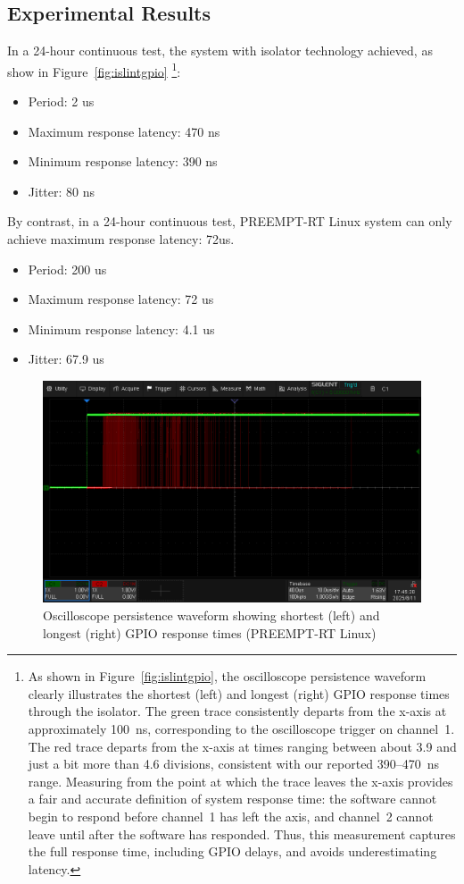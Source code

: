 \documentclass[letterpaper]{article}
\begin{document}
\subsection{Experimental Results}
In a 24-hour continuous test, the system with isolator technology achieved, as show in Figure~\ref{fig:islintgpio} \footnote {
As shown in Figure~\ref{fig:islintgpio}, the oscilloscope persistence waveform clearly
illustrates the shortest (left) and longest (right) GPIO response times
through the isolator. The green trace consistently departs from the
x-axis at approximately 100~ns, corresponding to the oscilloscope
trigger on channel~1. The red trace departs from the x-axis at times
ranging between about 3.9 and just a bit more than 4.6 divisions, consistent with our
reported 390--470~ns range. Measuring from the point at which the trace
leaves the x-axis provides a fair and accurate definition of system
response time: the software cannot begin to respond before channel~1
has left the axis, and channel~2 cannot leave until after the software
has responded. Thus, this measurement captures the full response time,
including GPIO delays, and avoids underestimating latency.
}:
\begin{itemize}
    \item Period: 2 us
    \item Maximum response latency: 470 ns
    \item Minimum response latency: 390 ns
    \item Jitter: 80 ns
\end{itemize}


By contrast, in a 24-hour continuous test,  PREEMPT-RT Linux system can only achieve maximum response latency:
72us.
\begin{itemize}
    \item Period: 200 us
    \item Maximum response latency: 72  us
    \item Minimum response latency: 4.1 us
    \item Jitter: 67.9 us
\end{itemize}

\begin{figure}[h]
  \centering
  \includegraphics[width=0.8\linewidth]{figures/linuxintgpio.png}
  \caption{Oscilloscope persistence waveform showing shortest (left) and longest (right) GPIO response times (PREEMPT-RT Linux)}
  \label{fig:linuxintgpio}
\end{figure}
\end{document}
